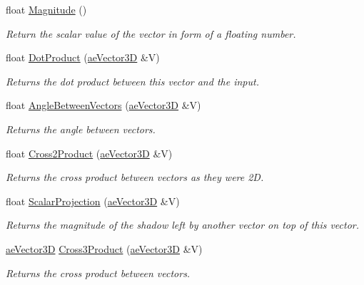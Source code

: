 \begin{DoxyCompactItemize}
\item 
float \hyperlink{structae_core_1_1ae_vector3_d_a017b73257c96ea42dda54324c3313c3f}{Magnitude} ()
\begin{DoxyCompactList}\small\item\em Return the scalar value of the vector in form of a floating number. \end{DoxyCompactList}\item 
float \hyperlink{structae_core_1_1ae_vector3_d_a344c941d3bd9a408b8d7de71f49506e7}{Dot\+Product} (\hyperlink{structae_core_1_1ae_vector3_d}{ae\+Vector3D} \&V)
\begin{DoxyCompactList}\small\item\em Returns the dot product between this vector and the input. \end{DoxyCompactList}\item 
float \hyperlink{structae_core_1_1ae_vector3_d_a1dbb10f35066329703faba9eda23e08a}{Angle\+Between\+Vectors} (\hyperlink{structae_core_1_1ae_vector3_d}{ae\+Vector3D} \&V)
\begin{DoxyCompactList}\small\item\em Returns the angle between vectors. \end{DoxyCompactList}\item 
float \hyperlink{structae_core_1_1ae_vector3_d_ad40e8a2379c56fdc3238fc4246d5b1dc}{Cross2\+Product} (\hyperlink{structae_core_1_1ae_vector3_d}{ae\+Vector3D} \&V)
\begin{DoxyCompactList}\small\item\em Returns the cross product between vectors as they were 2D. \end{DoxyCompactList}\item 
float \hyperlink{structae_core_1_1ae_vector3_d_aba5225fa4c9a56c0bb18dcc6c5947cb7}{Scalar\+Projection} (\hyperlink{structae_core_1_1ae_vector3_d}{ae\+Vector3D} \&V)
\begin{DoxyCompactList}\small\item\em Returns the magnitude of the shadow left by another vector on top of this vector. \end{DoxyCompactList}\item 
\hyperlink{structae_core_1_1ae_vector3_d}{ae\+Vector3D} \hyperlink{structae_core_1_1ae_vector3_d_a70d1f1c79b39266ba9a62aff088e00e3}{Cross3\+Product} (\hyperlink{structae_core_1_1ae_vector3_d}{ae\+Vector3D} \&V)
\begin{DoxyCompactList}\small\item\em Returns the cross product between vectors. \end{DoxyCompactList}\item 

\end{DoxyCompactItemize}
